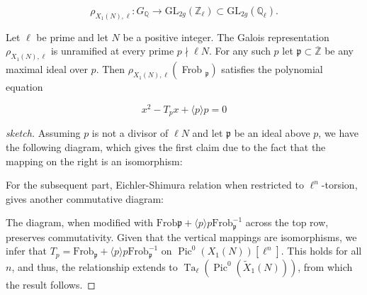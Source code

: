 $$
\rho_{X_{1}(N), \ell}: G_{\mathbb{Q}} \longrightarrow \mathrm{GL}_{2 g}\left(\mathbb{Z}_{\ell}\right) \subset \mathrm{GL}_{2 g}\left(\mathbb{Q}_{\ell}\right) .
$$

\begin{theorem}
    Let $\ell$ be prime and let $N$ be a positive integer. The Galois representation $\rho_{X_{1}(N), \ell}$ is unramified at every prime $p \nmid \ell N$. For any such $p$ let $\mathfrak{p} \subset \overline{\mathbb{Z}}$ be any maximal ideal over $p$. Then $\rho_{X_{1}(N), \ell}\left(\right.$ Frob $\left._{\mathfrak{p}}\right)$ satisfies the polynomial equation

$$
x^{2}-T_{p} x+\langle p\rangle p=0
$$

\end{theorem}
\begin{proof}[sketch]

Assuming \( p \) is not a divisor of \( \ell N \) and let \( \mathfrak{p} \) be an ideal above \( p \), we have the following diagram, which gives the first claim due to the fact that the mapping on the right is an isomorphism:
\begin{center}
    
\end{center}

For the subsequent part, Eichler-Shimura relation  when restricted to \( \ell^{n} \)-torsion, gives another  commutative diagram:

\begin{center}
\end{center}


The diagram, when modified with \( \text{Frob} \mathfrak{p} + \langle p \rangle p \text{Frob}_{\mathfrak{p}}^{-1} \) across the top row, preserves commutativity. Given that the vertical mappings are isomorphisms, we infer that \( T_{p} = \text{Frob}_{\mathfrak{p}} + \langle p \rangle p \text{Frob}_{\mathfrak{p}}^{-1} \) on \( \operatorname{Pic}^{0}(X_{1}(N))[\ell^{n}] \). This holds for all \( n \), and thus, the relationship extends to \( \operatorname{Ta}_{\ell}(\operatorname{Pic}^{0}(\widetilde{X}_{1}(N))) \), from which the result follows.

\end{proof}


